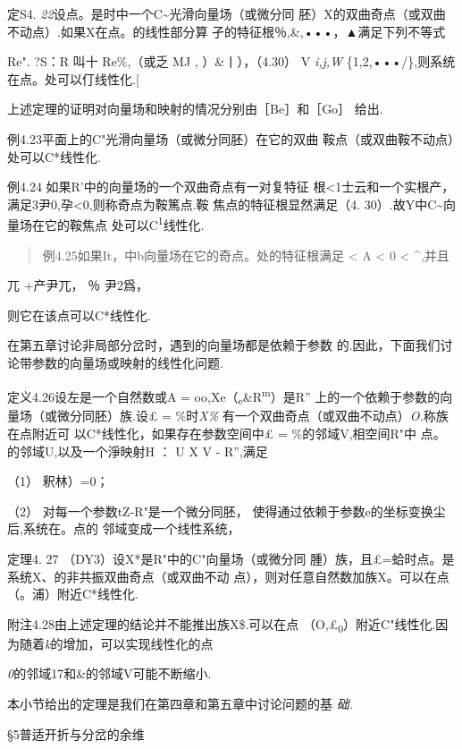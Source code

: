 \documentclass{article}
\begin{document}
定S4. \emph{22}设点。是时中一个C\textasciitilde{}光滑向量场（或微分同
胚）X的双曲奇点（或双曲不动点）.如果X在点。的线性部分算
孑的特征根％,\&,•••，▲满足下列不等式

Re". ?S：R 叫十 Re\%,（或乏 MJ , ）\&丨），（4.30） V \emph{i,j,W}
\{1,2,•••/\},则系统在点。处可以仃线性化.{[}

上述定理的证明对向量场和映射的情况分别由［Be］和［Go］ 给出.

例4.23平面上的C"光滑向量场（或微分同胚）在它的双曲
鞍点（或双曲鞍不动点）处可以C*线性化.

例4.24 如果R'中的向量场的一个双曲奇点有一对复特征
根\textless{}1士云和一个实根产，满足3尹0,孕\textless{}0,则称奇点为鞍篤点.鞍
焦点的特征根显然满足（4. 30）.故Y中C\textasciitilde{}向量场在它的鞍焦点
处可以C\textsuperscript{1}线性化.

\begin{quote}
例4.25如果It，中b向量场在它的奇点。处的特征根满足 \textless{} A
\textless{} 0 \textless{} \^{},并且
\end{quote}

兀 +产尹兀， ％ 尹2爲，

则它在该点可以C*线性化.

在第五章讨论非局部分岔时，遇到的向量场都是依赖于参数
的.因此，下面我们讨论带参数的向量场或映射的线性化问题.

定义4.26设左是一个自然数或A =
oo,Xe（\textsubscript{e}\&R\textsuperscript{m}）是R''
上的一个依赖于参数的向量场（或微分同胚）族.设£ = \%时\emph{X\%}
有一个双曲奇点（或双曲不动点）\emph{O.}称族在点附近可
以C*线性化，如果存在参数空间中£ = \%的邻域V,相空间R"中
点。的邻域U,以及一个淨映射H ： U X V - R'',满足

（1） 釈林）=0；

（2） 对每一个参数tZ-R"是一个微分同胚，
使得通过依赖于参数e的坐标变换尘后,系统在。点的 邻域变成一个线性系统，

定理4. 27 （DY3）设X*是R"中的C"向量场（或微分同
腫）族，且£=蛤时点。是系统X、的非共振双曲奇点（或双曲不动
点），则对任意自然数加族X。可以在点（。浦）附近C*线性化.

附注4.28由上述定理的结论并不能推出族X\$.可以在点
（O,£\textsubscript{0}）附近C"线性化.因为随着\emph{k}的增加，可以实现线性化的点

\emph{0}的邻域17和\&的邻域V可能不断缩小.

本小节给出的定理是我们在第四章和第五章中讨论问题的基 \emph{础.}

\protect\hypertarget{bookmark40}{}{}§5普适开折与分岔的余维
\end{document}
